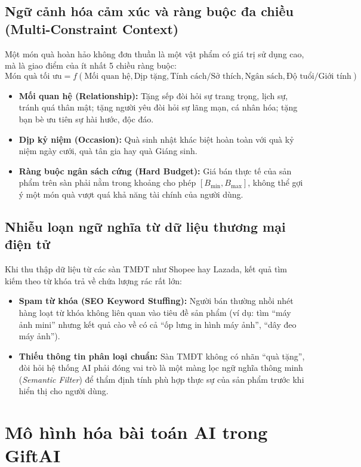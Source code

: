 \subsection{Ngữ cảnh hóa cảm xúc và ràng buộc đa chiều (Multi-Constraint Context)}
Một món quà hoàn hảo không đơn thuần là một vật phẩm có giá trị sử dụng cao, mà là giao điểm của ít nhất 5 chiều ràng buộc:
\begin{equation}
    \text{Món quà tối ưu} = f(\text{Mối quan hệ}, \text{Dịp tặng}, \text{Tính cách/Sở thích}, \text{Ngân sách}, \text{Độ tuổi/Giới tính})
\end{equation}
\begin{itemize}
    \item \textbf{Mối quan hệ (Relationship):} Tặng sếp đòi hỏi sự trang trọng, lịch sự, tránh quá thân mật; tặng người yêu đòi hỏi sự lãng mạn, cá nhân hóa; tặng bạn bè ưu tiên sự hài hước, độc đáo.
    \item \textbf{Dịp kỷ niệm (Occasion):} Quà sinh nhật khác biệt hoàn toàn với quà kỷ niệm ngày cưới, quà tân gia hay quà Giáng sinh.
    \item \textbf{Ràng buộc ngân sách cứng (Hard Budget):} Giá bán thực tế của sản phẩm trên sàn phải nằm trong khoảng cho phép $[B_{\min}, B_{\max}]$, không thể gợi ý một món quà vượt quá khả năng tài chính của người dùng.
\end{itemize}

\subsection{Nhiễu loạn ngữ nghĩa từ dữ liệu thương mại điện tử}
Khi thu thập dữ liệu từ các sàn TMĐT như Shopee hay Lazada, kết quả tìm kiếm theo từ khóa trả về chứa lượng rác rất lớn:
\begin{itemize}
    \item \textbf{Spam từ khóa (SEO Keyword Stuffing):} Người bán thường nhồi nhét hàng loạt từ khóa không liên quan vào tiêu đề sản phẩm (ví dụ: tìm ``máy ảnh mini'' nhưng kết quả cào về có cả ``ốp lưng in hình máy ảnh'', ``dây đeo máy ảnh'').
    \item \textbf{Thiếu thông tin phân loại chuẩn:} Sàn TMĐT không có nhãn ``quà tặng'', đòi hỏi hệ thống AI phải đóng vai trò là một màng lọc ngữ nghĩa thông minh (\textit{Semantic Filter}) để thẩm định tính phù hợp thực sự của sản phẩm trước khi hiển thị cho người dùng.
\end{itemize}

\section{Mô hình hóa bài toán AI trong GiftAI}

